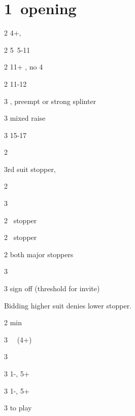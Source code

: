 \documentclass[12pt, a4paper]{report}
\begin{document}
        \section*{\colorbox{blue!30}{1\diams\ opening}}
         {

            \begin{thoptions}
                \item[2\diams] 4+\diams, \invp
                \item[2\hearts] 5\hearts\ 5-11
                \item[2\spades] 11+ \bal, no 4\major
                \item[2\nt] 11-12 \bal
                \item[3\clubs] \diams, preempt or strong splinter
                \item[3\diams] mixed raise
                \item[3\nt] 15-17 \bal
            \end{thoptions}

            \begin{thoptions}
                \item[2\major] \nf
                \item[3rd suit] stopper, \gf
                \item[2\nt] \gf
                \item[3\diams] \inv
            \end{thoptions}

            \begin{thoptions}
                \item[2\hearts] \hearts\ stopper
                \item[2\spades] \spades\ stopper
                \item[2\nt] both major stoppers
                \item[3\clubs] \nat
                \item[3\diams] sign off (threshold for invite)
            \end{thoptions}

            Bidding higher suit denies lower stopper.

            \begin{thoptions}
                \item[2\nt] \bal min
                \item[3\clubs] \nat\ \nf\ (4+)
                \item[3\diams] \nat\ \nf
                \item[3\hearts] 1-\hearts, 5+\diams\ \gf
                \item[3\spades] 1-\spades, 5+\diams\ \gf
                \item[3\nt] to play
            \end{thoptions}

}
\end{document}
